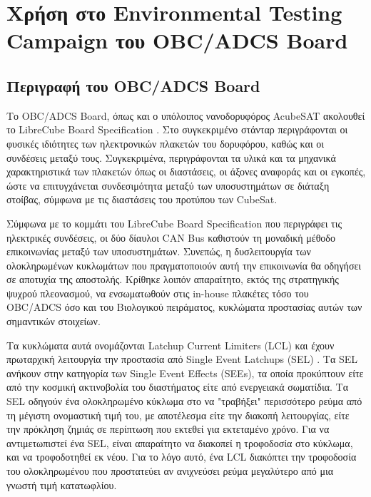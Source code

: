 \documentclass[a4paper,nobib,justified]{tufte-book}
\begin{document}
\section{Χρήση στο Environmental Testing Campaign του OBC/ADCS Board}
\subsection{Περιγραφή του OBC/ADCS Board}
\par Το OBC/ADCS Board, όπως και ο υπόλοιπος νανοδορυφόρος AcubeSAT ακολουθεί το LibreCube Board Specification . Στο συγκεκριμένο στάνταρ περιγράφονται οι φυσικές ιδιότητες των ηλεκτρονικών πλακετών του δορυφόρου, καθώς και οι συνδέσεις μεταξύ τους. Συγκεκριμένα, περιγράφονται τα υλικά και τα μηχανικά χαρακτηριστικά των πλακετών όπως οι διαστάσεις, οι άξονες αναφοράς και οι εγκοπές, ώστε να επιτυγχάνεται συνδεσιμότητα μεταξύ των υποσυστημάτων σε διάταξη στοίβας, σύμφωνα με τις διαστάσεις του προτύπου των CubeSat.

Σύμφωνα με το κομμάτι του LibreCube Board Specification που περιγράφει τις ηλεκτρικές συνδέσεις, οι δύο δίαυλοι CAN Bus καθιστούν τη μοναδική μέθοδο επικοινωνίας μεταξύ των υποσυστημάτων. Συνεπώς, η δυσλειτουργία των ολοκληρωμένων κυκλωμάτων που πραγματοποιούν αυτή την επικοινωνία θα οδηγήσει σε αποτυχία της αποστολής. Κρίθηκε λοιπόν απαραίτητο, εκτός της στρατηγικής ψυχρού πλεονασμού, να ενσωματωθούν στις in-house πλακέτες τόσο του OBC/ADCS όσο και του Βιολογικού πειράματος, κυκλώματα προστασίας αυτών των σημαντικών στοιχείων. 

Τα κυκλώματα αυτά ονομάζονται Latchup Current Limiters (LCL) και έχουν πρωταρχική λειτουργία την προστασία από Single Event Latchups (SEL) . Tα SEL ανήκουν στην κατηγορία των Single Event Effects (SEEs), τα οποία προκύπτουν είτε από την κοσμική ακτινοβολία του διαστήματος είτε από ενεργειακά σωματίδια. Tα SEL οδηγούν ένα ολοκληρωμένο κύκλωμα στο να "τραβήξει" περισσότερο ρεύμα από τη μέγιστη ονομαστική τιμή του, με αποτέλεσμα είτε την διακοπή λειτουργίας, είτε την πρόκληση ζημιάς σε περίπτωση που εκτεθεί για εκτεταμένο χρόνο. Για να αντιμετωπιστεί ένα SEL, είναι απαραίτητο να διακοπεί η τροφοδοσία στο κύκλωμα, και να τροφοδοτηθεί εκ νέου. Για το λόγο αυτό, ένα LCL διακόπτει την τροφοδοσία του ολοκληρωμένου που προστατεύει αν ανιχνεύσει ρεύμα μεγαλύτερο από μια γνωστή τιμή κατατωφλίου.
\end{document}
